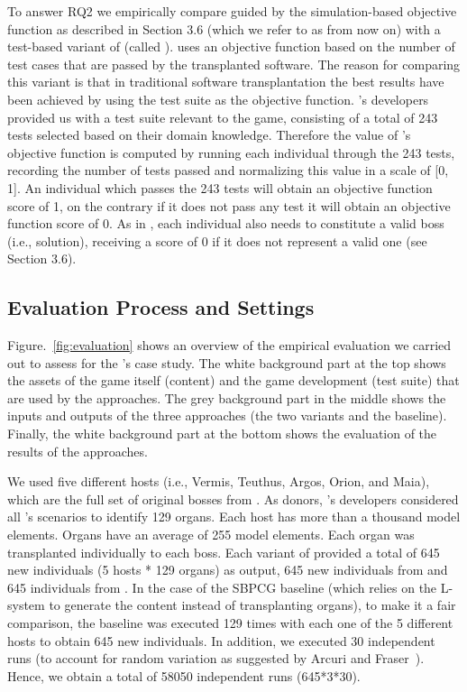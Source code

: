 To answer RQ2 we empirically compare \ApproachName guided by the simulation-based objective function as described in Section 3.6 (which we refer to as \simhotep{} from now on) with  a test-based variant of \ApproachName{} (called \timhotep{}). \timhotep{} uses an objective function based on the number of test cases that are passed by the transplanted software. 
The reason for comparing this variant is that in traditional software transplantation the best results have been achieved by using the test suite as the objective function. 
\CaseStudy{}'s developers provided us with a test suite relevant to the game, consisting of a total of 243 tests selected based on their domain knowledge. 
Therefore the value of \timhotep{}'s objective function is computed by running each individual through the 243 tests, recording the number of tests passed and normalizing this value in a scale of [0, 1]. An individual which passes the 243 tests will obtain an objective function score of 1, on the contrary if it does not pass any test it will obtain an objective function score of 0.  
As in \simhotep{},  each individual also needs to constitute a valid boss (i.e., solution), receiving a score of 0 if it does not represent a valid one (see Section 3.6).

\subsection{Evaluation Process and Settings}
Figure.~\ref{fig:evaluation} shows an overview of the empirical evaluation we carried out to assess \ApproachName for the \CaseStudy's case study. The white background part at the top shows the assets of the game itself (content) and the game development (test suite) that are used by the approaches. The grey background part in the middle shows the inputs and outputs of the three approaches (the two \ApproachName{} variants and the baseline). Finally, the white background part at the bottom shows the evaluation of the results of the approaches.

We used five different hosts (i.e., Vermis, Teuthus, Argos, Orion, and Maia), which are the full set of original bosses from \CaseStudy{}. As donors, \CaseStudy{}'s developers considered all \CaseStudy{}'s scenarios to identify 129 organs. Each host has more than a thousand model elements. Organs have an average of 255 model elements. Each organ was transplanted individually to each boss. Each variant of \ApproachName{} provided a total of 645 new individuals (5 hosts * 129 organs) as output, 645 new individuals from \simhotep{} and 645 individuals from \timhotep{}. In the case of the SBPCG baseline (which relies on the L-system to generate the content instead of transplanting organs), to make it a fair comparison, the baseline was executed 129 times with each one of the 5 different hosts to obtain 645 new individuals. In addition, we executed 30 independent runs (to account for random variation as suggested by Arcuri and Fraser~\cite{arcuri2013parameter}). Hence, we obtain a total of 58050 independent runs (645*3*30).

